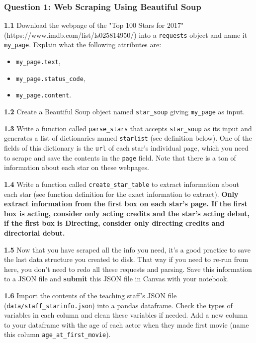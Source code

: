 \documentclass[11pt]{article}
\providecommand{\tightlist}{%
      \setlength{\itemsep}{0pt}\setlength{\parskip}{0pt}}
\begin{document}
\subsubsection{Question 1: Web Scraping Using Beautiful
Soup}\label{question-1-web-scraping-using-beautiful-soup}

\textbf{1.1} Download the webpage of the "Top 100 Stars for 2017"
(https://www.imdb.com/list/ls025814950/) into a \texttt{requests} object
and name it \texttt{my\_page}. Explain what the following attributes
are:

\begin{itemize}
\tightlist
\item
  \texttt{my\_page.text},
\item
  \texttt{my\_page.status\_code},
\item
  \texttt{my\_page.content}.
\end{itemize}

\textbf{1.2} Create a Beautiful Soup object named \texttt{star\_soup}
giving \texttt{my\_page} as input.

\textbf{1.3} Write a function called \texttt{parse\_stars} that accepts
\texttt{star\_soup} as its input and generates a list of dictionaries
named \texttt{starlist} (see definition below). One of the fields of
this dictionary is the \texttt{url} of each star's individual page,
which you need to scrape and save the contents in the \texttt{page}
field. Note that there is a ton of information about each star on these
webpages.

\textbf{1.4} Write a function called \texttt{create\_star\_table} to
extract information about each star (see function definition for the
exact information to extract). \textbf{Only extract information from the
first box on each star's page. If the first box is acting, consider only
acting credits and the star's acting debut, if the first box is
Directing, consider only directing credits and directorial debut.}

\textbf{1.5} Now that you have scraped all the info you need, it's a
good practice to save the last data structure you created to disk. That
way if you need to re-run from here, you don't need to redo all these
requests and parsing. Save this information to a JSON file and
\textbf{submit} this JSON file in Canvas with your notebook.

\textbf{1.6} Import the contents of the teaching staff's JSON file
(\texttt{data/staff\_starinfo.json}) into a pandas dataframe. Check the
types of variables in each column and clean these variables if needed.
Add a new column to your dataframe with the age of each actor when they
made first movie (name this column \texttt{age\_at\_first\_movie}).
\end{document}
